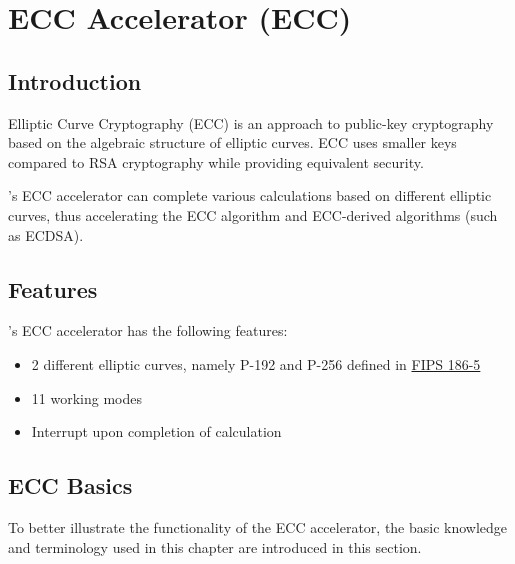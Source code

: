 \documentclass[main\_\_EN.tex]{subfiles}
\begin{document}

\ifglobal
\else
    {\let\clearpage\relax \listoftodos}
    {\let\clearpage\relax \listofdonetodos}
    \tableofcontents
\fi



\hypertarget{ecc}{}
\chapter{ECC Accelerator (ECC)}
\label{mod:ecc}

\section{Introduction}

Elliptic Curve Cryptography (ECC) is an approach to public-key cryptography based on the algebraic structure of elliptic curves. ECC uses smaller keys compared to RSA cryptography while providing equivalent security.

\chipname{}'s ECC accelerator can complete various calculations based on different elliptic curves, thus accelerating the ECC algorithm and ECC-derived algorithms (such as ECDSA).

\section{Features}
\chipname{}'s ECC accelerator has the following features:
\begin{itemize}
    \item 2 different elliptic curves, namely P-192 and P-256 defined in \href{https://nvlpubs.nist.gov/nistpubs/FIPS/NIST.FIPS.186-5.pdf}{FIPS 186-5}
    \item 11 working modes
    \item Interrupt upon completion of calculation
\end{itemize}

\section{ECC Basics}
To better illustrate the functionality of the ECC accelerator, the basic knowledge and terminology used in this chapter are introduced in this section.
\end{document}
